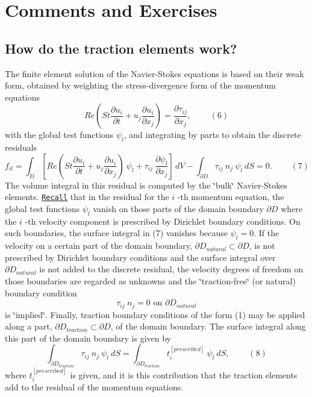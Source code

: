 \hypertarget{index_comments}{}\section{Comments and Exercises}\label{index_comments}
\hypertarget{index_traction_theory}{}\subsection{How do the traction elements work?}\label{index_traction_theory}
The finite element solution of the Navier-\/\+Stokes equations is based on their weak form, obtained by weighting the stress-\/divergence form of the momentum equations \[ Re\left(St\frac{\partial u_i}{\partial t} + u_j\frac{\partial u_i}{\partial x_j}\right) = \frac{\partial \tau_{ij}}{\partial x_j}, \ \ \ \ \ \ \ \ \ \ (6) \] with the global test functions $ \psi_l $, and integrating by parts to obtain the discrete residuals \[ f_{il} = \int_D \left[ Re\left(St\frac{\partial u_i}{\partial t} + u_j\frac{\partial u_i}{\partial x_j}\right) \ \psi_l + \tau_{ij} \ \frac{\partial \psi_l}{\partial x_j} \right] \, dV - \int_{\partial D} \tau_{ij} \ n_j \ \psi_l \ dS = 0. \ \ \ \ \ \ \ \ \ \ (7) \] The volume integral in this residual is computed by the \char`\"{}bulk\char`\"{} Navier-\/\+Stokes elements. \href{../../../intro/html/index.html#galerkin}{\tt Recall} that in the residual for the $ i $ -\/th momentum equation, the global test functions $ \psi_l $ vanish on those parts of the domain boundary $ \partial D$ where the $ i $ -\/th velocity component is prescribed by Dirichlet boundary conditions. On such boundaries, the surface integral in (7) vanishes because $ \psi_l=0. $ If the velocity on a certain part of the domain boundary, $ \partial D_{natural} \subset \partial D$, is not prescribed by Dirichlet boundary conditions and the surface integral over $ \partial D_{natural} $ is not added to the discrete residual, the velocity degrees of freedom on those boundaries are regarded as unknowns and the \char`\"{}traction-\/free\char`\"{} (or natural) boundary condition \[ \tau_{ij} \ n_j = 0 \mbox{ \ \ \ on \ \ $\partial D_{natural}$} \] is \char`\"{}implied\char`\"{}. Finally, traction boundary conditions of the form (1) may be applied along a part, $ \partial D_{traction} \subset \partial D$, of the domain boundary. The surface integral along this part of the domain boundary is given by \[ \int_{\partial D_{traction} } \tau_{ij} \ n_j \ \psi_l \ dS = \int_{\partial D_{traction} } t_i^{[prescribed]} \ \psi_l \ dS, \ \ \ \ \ \ \ \ \ \ (8) \] where $ t_i^{[prescribed]} $ is given, and it is this contribution that the traction elements add to the residual of the momentum equations.




